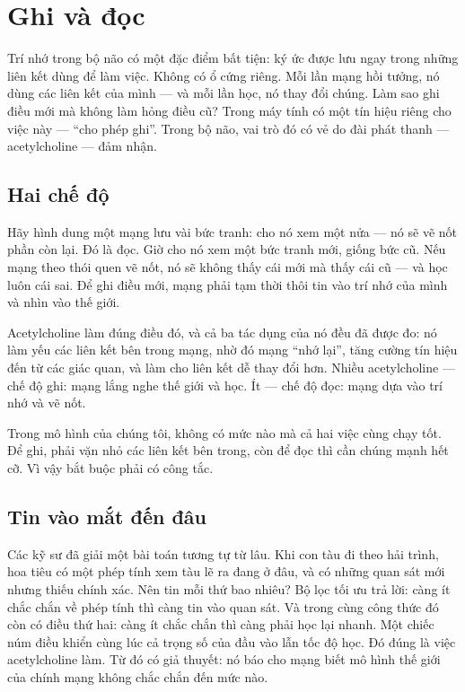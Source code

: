 \chapter{Ghi và đọc}

Trí nhớ trong bộ não có một đặc điểm bất tiện: ký ức được lưu ngay trong những liên kết dùng để làm việc. Không có ổ cứng riêng. Mỗi lần mạng hồi tưởng, nó dùng các liên kết của mình --- và mỗi lần học, nó thay đổi chúng. Làm sao ghi điều mới mà không làm hỏng điều cũ? Trong máy tính có một tín hiệu riêng cho việc này --- ``cho phép ghi''. Trong bộ não, vai trò đó có vẻ do đài phát thanh  --- acetylcholine --- đảm nhận.

\section*{Hai chế độ}

Hãy hình dung một mạng lưu vài bức tranh: cho nó xem một nửa --- nó sẽ vẽ nốt phần còn lại. Đó là đọc. Giờ cho nó xem một bức tranh mới, giống bức cũ. Nếu mạng theo thói quen vẽ nốt, nó sẽ không thấy cái mới mà thấy cái cũ --- và học luôn cái sai. Để ghi điều mới, mạng phải tạm thời thôi tin vào trí nhớ của mình và nhìn vào thế giới.


Acetylcholine làm đúng điều đó, và cả ba tác dụng của nó đều đã được đo: nó làm yếu các liên kết bên trong mạng, nhờ đó mạng ``nhớ lại'', tăng cường tín hiệu đến từ các giác quan, và làm cho liên kết dễ thay đổi hơn. Nhiều acetylcholine --- chế độ ghi: mạng lắng nghe thế giới và học. Ít --- chế độ đọc: mạng dựa vào trí nhớ và vẽ nốt.

Trong mô hình của chúng tôi, không có mức nào mà cả hai việc cùng chạy tốt. Để ghi, phải vặn nhỏ các liên kết bên trong, còn để đọc thì cần chúng mạnh hết cỡ. Vì vậy bắt buộc phải có công tắc.

\section*{Tin vào mắt đến đâu}

Các kỹ sư đã giải một bài toán tương tự từ lâu. Khi con tàu đi theo hải trình, hoa tiêu có một phép tính xem tàu lẽ ra đang ở đâu, và có những quan sát mới nhưng thiếu chính xác. Nên tin mỗi thứ bao nhiêu? Bộ lọc tối ưu trả lời: càng ít chắc chắn về phép tính thì càng tin vào quan sát. Và trong cùng công thức đó còn có điều thứ hai: càng ít chắc chắn thì càng phải học lại nhanh. Một chiếc núm điều khiển cùng lúc cả trọng số của đầu vào lẫn tốc độ học. Đó đúng là việc acetylcholine làm. Từ đó có giả thuyết: nó báo cho mạng biết mô hình thế giới của chính mạng không chắc chắn đến mức nào.

